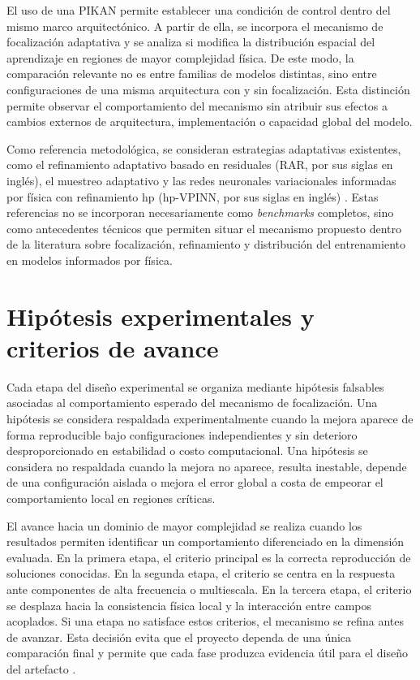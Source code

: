 El uso de una PIKAN permite establecer una condición de control dentro del mismo marco arquitectónico. A partir de ella, se incorpora el mecanismo de focalización adaptativa y se analiza si modifica la distribución espacial del aprendizaje en regiones de mayor complejidad física. De este modo, la comparación relevante no es entre familias de modelos distintas, sino entre configuraciones de una misma arquitectura con y sin focalización. Esta distinción permite observar el comportamiento del mecanismo sin atribuir sus efectos a cambios externos de arquitectura, implementación o capacidad global del modelo.

Como referencia metodológica, se consideran estrategias adaptativas existentes, como el refinamiento adaptativo basado en residuales (RAR, por sus siglas en inglés), el muestreo adaptativo y las redes neuronales variacionales informadas por física con refinamiento hp (hp-VPINN, por sus siglas en inglés) \cite{lu2021deepxde,wu2023sampling,kharazmi2021hpvpinns}. Estas referencias no se incorporan necesariamente como \textit{benchmarks} completos, sino como antecedentes técnicos que permiten situar el mecanismo propuesto dentro de la literatura sobre focalización, refinamiento y distribución del entrenamiento en modelos informados por física.

\section{Hipótesis experimentales y criterios de avance}
\label{subsec:hipotesis-avance}

Cada etapa del diseño experimental se organiza mediante hipótesis falsables asociadas al comportamiento esperado del mecanismo de focalización. Una hipótesis se considera respaldada experimentalmente cuando la mejora aparece de forma reproducible bajo configuraciones independientes y sin deterioro desproporcionado en estabilidad o costo computacional. Una hipótesis se considera no respaldada cuando la mejora no aparece, resulta inestable, depende de una configuración aislada o mejora el error global a costa de empeorar el comportamiento local en regiones críticas.

El avance hacia un dominio de mayor complejidad se realiza cuando los resultados permiten identificar un comportamiento diferenciado en la dimensión evaluada. En la primera etapa, el criterio principal es la correcta reproducción de soluciones conocidas. En la segunda etapa, el criterio se centra en la respuesta ante componentes de alta frecuencia o multiescala. En la tercera etapa, el criterio se desplaza hacia la consistencia física local y la interacción entre campos acoplados. Si una etapa no satisface estos criterios, el mecanismo se refina antes de avanzar. Esta decisión evita que el proyecto dependa de una única comparación final y permite que cada fase produzca evidencia útil para el diseño del artefacto \cite{peffers2007dsrm,shukla2024fair}.

